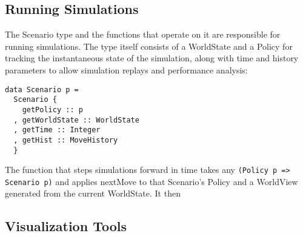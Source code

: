 \subsection{Running Simulations}

The Scenario type and the functions that operate on it are responsible for running simulations. The type itself consists of a WorldState and a Policy for tracking the instantaneous state of the simulation, along with time and history parameters to allow simulation replays and performance analysis:

\begin{verbatim}
data Scenario p =
  Scenario {
    getPolicy :: p
  , getWorldState :: WorldState
  , getTime :: Integer
  , getHist :: MoveHistory
  }
\end{verbatim}

The function that steps simulations forward in time takes any \verb|(Policy p => Scenario p)| and applies nextMove to that Scenario's Policy and a WorldView generated from the current WorldState. It then 

\subsection{Visualization Tools}

